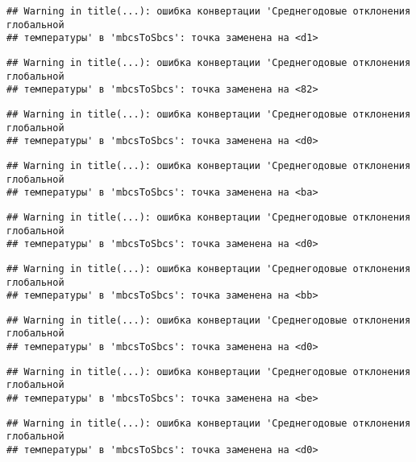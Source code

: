 \documentclass[
]{article}
\begin{document}
\begin{verbatim}
## Warning in title(...): ошибка конвертации 'Среднегодовые отклонения глобальной
## температуры' в 'mbcsToSbcs': точка заменена на <d1>
\end{verbatim}

\begin{verbatim}
## Warning in title(...): ошибка конвертации 'Среднегодовые отклонения глобальной
## температуры' в 'mbcsToSbcs': точка заменена на <82>
\end{verbatim}

\begin{verbatim}
## Warning in title(...): ошибка конвертации 'Среднегодовые отклонения глобальной
## температуры' в 'mbcsToSbcs': точка заменена на <d0>
\end{verbatim}

\begin{verbatim}
## Warning in title(...): ошибка конвертации 'Среднегодовые отклонения глобальной
## температуры' в 'mbcsToSbcs': точка заменена на <ba>
\end{verbatim}

\begin{verbatim}
## Warning in title(...): ошибка конвертации 'Среднегодовые отклонения глобальной
## температуры' в 'mbcsToSbcs': точка заменена на <d0>
\end{verbatim}

\begin{verbatim}
## Warning in title(...): ошибка конвертации 'Среднегодовые отклонения глобальной
## температуры' в 'mbcsToSbcs': точка заменена на <bb>
\end{verbatim}

\begin{verbatim}
## Warning in title(...): ошибка конвертации 'Среднегодовые отклонения глобальной
## температуры' в 'mbcsToSbcs': точка заменена на <d0>
\end{verbatim}

\begin{verbatim}
## Warning in title(...): ошибка конвертации 'Среднегодовые отклонения глобальной
## температуры' в 'mbcsToSbcs': точка заменена на <be>
\end{verbatim}

\begin{verbatim}
## Warning in title(...): ошибка конвертации 'Среднегодовые отклонения глобальной
## температуры' в 'mbcsToSbcs': точка заменена на <d0>
\end{verbatim}
\end{document}
